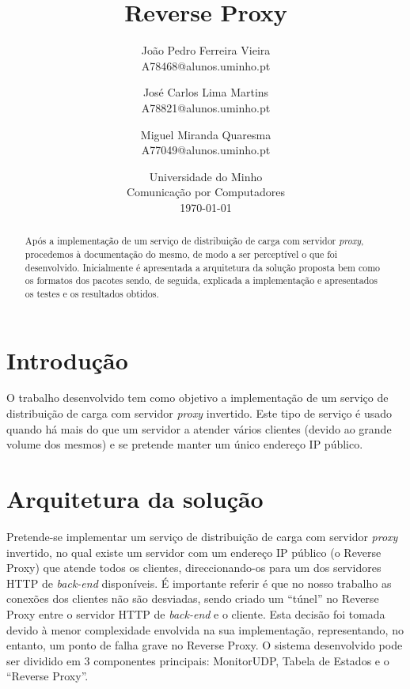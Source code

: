 \documentclass{article}
\begin{document}
\title{\textbf{Reverse Proxy}}
\author{João Pedro Ferreira Vieira\\
		A78468@alunos.uminho.pt \and
		José Carlos Lima Martins\\
        A78821@alunos.uminho.pt \and
        Miguel Miranda Quaresma\\
        A77049@alunos.uminho.pt}
\date{Universidade do Minho\\
	  Comunicação por Computadores\\[2ex]%
      \today}
\maketitle

\begin{abstract}
Após a implementação de um serviço de distribuição de carga com servidor \textit{proxy}, procedemos à documentação do mesmo, de modo a ser perceptível o que foi desenvolvido. Inicialmente é apresentada a arquitetura da solução proposta bem como os formatos dos pacotes sendo, de seguida, explicada a implementação e apresentados os testes e os resultados obtidos.
\end{abstract}

\section{Introdução}
O trabalho desenvolvido tem como objetivo a implementação de um serviço de distribuição de carga com servidor \textit{proxy} invertido. Este tipo de serviço é usado quando há mais do que um servidor a atender vários clientes (devido ao grande volume dos mesmos) e se pretende manter um único endereço IP público.

\section{Arquitetura da solução}
Pretende-se implementar um serviço de distribuição de carga com servidor \textit{proxy} invertido, no qual existe um servidor com um endereço IP público (o Reverse Proxy) que atende todos os clientes, direccionando-os para um dos servidores HTTP de \textit{back-end} disponíveis. 
É importante referir é que no nosso trabalho as conexões dos clientes não são desviadas, sendo criado um ``túnel'' no Reverse Proxy entre o servidor HTTP de \textit{back-end} e o cliente. Esta decisão foi tomada devido à menor complexidade envolvida na sua implementação, representando, no entanto, um ponto de falha grave no Reverse Proxy.
O sistema desenvolvido pode ser dividido em 3 componentes principais: MonitorUDP, Tabela de Estados e o ``Reverse Proxy''. 
\end{document}
